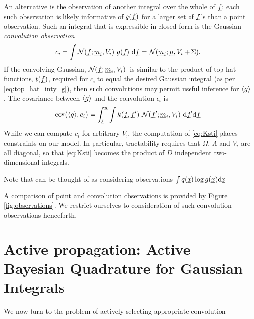\documentclass[twoside]{article}
\begin{document}

An alternative is the observation of another integral over the whole of $\underline{\smash{f}}$: each such observation is likely informative of $g(\underline{\smash{f}})$ for a larger set of $\underline{\smash{f}}$'s than a point observation.
Such an integral that is expressible in closed form is the Gaussian \emph{convolution observation}
 \begin{equation}\label{eq:conv}
 c_i = \int \mathcal{N}(\underline{\smash{f}};\underline{\smash{m}}_i,V_i)~g(\underline{\smash{f}})~\mathrm{d} \underline{\smash{f}} = \mathcal{N}(\underline{\smash{m}}_i;\underline{\smash{\mu}},V_i+\Sigma).
\end{equation}
 If the convolving Gaussian, $\mathcal{N}(\underline{\smash{f}};\underline{\smash{m}}_i,V_i)$, is similar to the product of top-hat functions, $t(\underline{\smash{f}})$, required for $c_i$ to equal the desired Gaussian integral (as per \eqref{eq:top_hat_inty_g}), then such convolutions may permit useful inference for $\langle g \rangle$. The covariance between $\langle g \rangle$ and the convolution $c_i$ is
\begin{align}\label{eq:Ksti}
\text{cov}\bigl(\langle g \rangle, c_i\bigr) =
\int_{\underline{\smash{\ell}}}^{\underline{\smash{u}}} \int  k(\underline{\smash{f}}, \underline{\smash{f}}')~\mathcal{N}(\underline{\smash{f}}';\underline{\smash{m}}_i,V_i)~\mathrm{d} \underline{\smash{f}}' \mathrm{d} \underline{\smash{f}} 
\end{align}
While we can compute $c_i$ for arbitrary $V_i$, the computation of \eqref{eq:Ksti} places constraints on our model. In particular, tractability requires that $\Omega$, $\Lambda$ and $V_i$ are all diagonal, so that \eqref{eq:Ksti} becomes the product of $D$ independent two-dimensional integrals.

Note that \vb can be thought of as considering observations $\int q(\underline{\smash{x}}) \log g(\underline{\smash{x}}) \mathrm{d}\underline{\smash{x}}$



A comparison of point and convolution observations is provided by Figure \ref{fig:observations}. 
We restrict ourselves to consideration of such convolution observations henceforth.


\section{Active propagation: Active Bayesian Quadrature for Gaussian Integrals}
\label{sec:active}

We now turn to the problem of actively selecting appropriate convolution 



\end{document}
